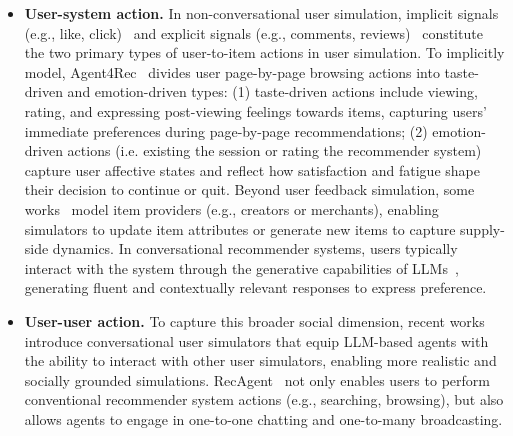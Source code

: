 \begin{itemize}
    \item 
\textbf{User-system action.} In non-conversational user simulation, implicit signals (e.g., like, click)~\cite{zhang2024agent4rec, park2025llm, zhang2025llm, huang2025large, bougie2026alignuser} and explicit signals (e.g., comments, reviews)~\cite{recagent} constitute the two primary types of user-to-item actions in user simulation. To implicitly model,
Agent4Rec~\cite{zhang2024agent4rec} divides user page-by-page browsing actions into taste-driven and emotion-driven types: (1) taste-driven actions include viewing, rating, and expressing post-viewing feelings towards items, capturing users’ immediate preferences during page-by-page recommendations; (2) emotion-driven actions (i.e. existing the session or rating the recommender system) capture user affective states and reflect how satisfaction and fatigue shape their decision to continue or quit. Beyond user feedback simulation, some works~\cite{ye2025creagent, jin2025recinter} model item providers (e.g., creators or merchants), enabling simulators to update item attributes or generate new items to capture supply-side dynamics.
In conversational recommender systems, users typically interact with the system through the generative capabilities of LLMs~\cite{chen2025recusersim, feng2025expectation}, generating fluent and contextually relevant responses to express preference.




\item \textbf{User-user action.} 
To capture this broader social dimension, recent works~\cite{recagent} introduce conversational user simulators that equip LLM-based agents with the ability to interact with other user simulators, enabling more realistic and socially grounded simulations.
RecAgent~\cite{recagent} not only enables users to perform conventional recommender system actions (e.g., searching, browsing), but also allows agents to engage in one-to-one chatting and one-to-many broadcasting. 



    
\end{itemize}
% 



